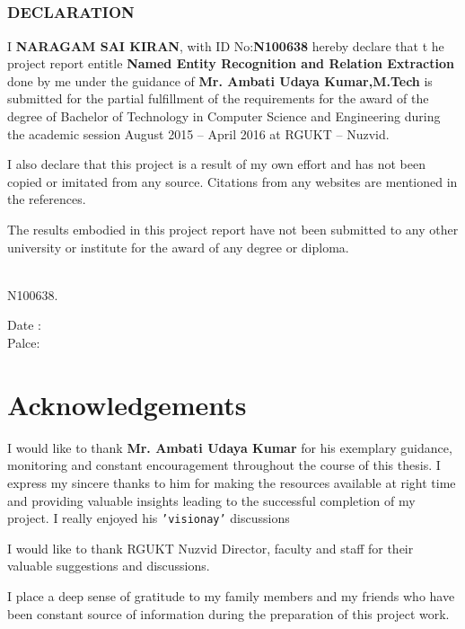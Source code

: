 \documentclass[12pt]{report}
\newcommand*{\Signature}[1]{
	\vspace{3cm}
    \par\noindent\makebox[5cm]{\hrulefill}
    \par\noindent\makebox[5cm][l]{#1}
}
\begin{document}
\section*{}
\thispagestyle{fancy}
\begin{center}\makebox[15cm]{\hrulefill}\end{center}
\vspace{1cm}
\begin{center}
\subsection*{DECLARATION\\\makebox[5cm]{\hrulefill}}

\end{center}
\par I \textbf{NARAGAM SAI KIRAN}, with ID No:\textbf{N100638} hereby declare that t
he project report entitle \textbf{Named Entity Recognition and Relation Extraction} done by me
 under the guidance of \textbf{Mr. Ambati Udaya Kumar,M.Tech} is submitted for the partial
  fulfillment of the requirements for the award of the degree of Bachelor of Technology
   in Computer Science and Engineering during the academic session August 2015 – April 2016 at RGUKT – Nuzvid.

\par I also declare that this project is a result of my own effort and has not been copied or imitated from any source.
 Citations from any websites are mentioned in the references.
\par The results embodied in this project report have not been submitted to any other university or institute for the award of any degree or diploma.

\Signature{N. SAI KIRAN,}\\N100638.\\
\begin{flushright}
Date : \makebox[3cm]{\hrulefill}\\
Palce: \makebox[3cm]{\hrulefill}\\
\end{flushright}
\pagebreak

\chapter*{Acknowledgements}
\par I would like to thank \textbf{Mr. Ambati Udaya Kumar} for his exemplary guidance, monitoring and constant encouragement throughout the course of this thesis.
	I express my sincere thanks to him for making the resources available at right time and providing valuable insights leading to the successful completion of my project.
I really enjoyed his \texttt{'visionay'} discussions
	\par I would like to thank RGUKT Nuzvid Director, faculty and staff for their valuable suggestions and discussions.
	\par I place a deep sense of gratitude to my family members and my friends who have been constant source of information during the preparation of this project work.
\end{document}
